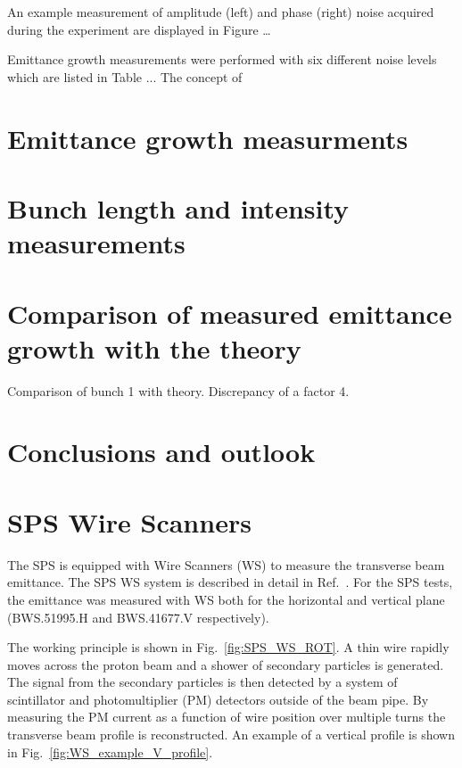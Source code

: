 An example measurement of amplitude (left) and phase (right) noise acquired during the experiment are displayed in Figure \dots



Emittance growth measurements were performed with six different noise levels which are listed in Table ... The concept of 

\section{Emittance growth measurments}\label{sec:emit_growth_meas_2018}


\section{Bunch length and intensity measurements}\label{sec:bunch_length_intensity_meas_2018}

\section{Comparison of measured emittance growth with the theory}\label{sec:meas_2018_vs_theory}

Comparison of bunch 1 with theory. Discrepancy of a factor 4.

\section{Conclusions and outlook}\label{sec:MD2018_summary}





\section{SPS Wire Scanners}\label{sec:sps_ws}
The SPS is equipped with Wire Scanners (WS) to measure the transverse beam emittance. The SPS WS system is described in detail in Ref.~\cite{BOSSER1985475, Berrig:1972478}. For the SPS tests, the emittance was measured with WS both for the horizontal and vertical plane (BWS.51995.H and BWS.41677.V respectively).

The working principle is shown in Fig.~\ref{fig:SPS_WS_ROT}. A thin wire rapidly moves across the proton beam and a shower of secondary particles is generated. The signal from the secondary particles is then detected by a system of scintillator and photomultiplier (PM) detectors outside of the beam pipe. By measuring the PM current as a function of wire position over multiple turns the transverse beam profile is reconstructed. An example of a vertical profile is shown in Fig.~\ref{fig:WS_example_V_profile}.

